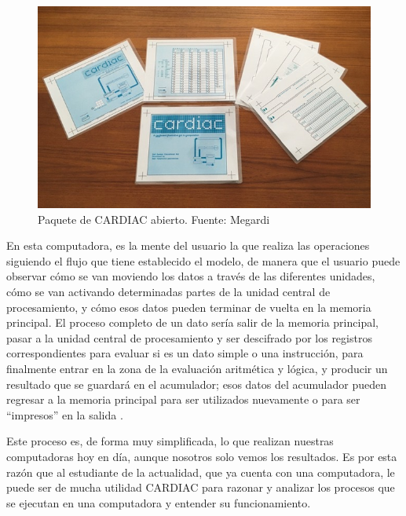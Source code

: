 \documentclass[letterpaper,12pt,oneside]{book}
\begin{document}
		\begin{figure}[h]
		\centering
			\includegraphics[scale=0.6]{media/CARDIAC_Paper/paper1.jpg}
			\caption{Paquete de CARDIAC abierto. Fuente: Megardi \cite{megardi_cardiac_nodate}}
			\label{fig:Kit_CARDIAC}%
		\end{figure}
		
		
		
		En esta computadora, es la mente del usuario la que realiza las operaciones  siguiendo el flujo que tiene establecido el modelo, de manera
		que el usuario  puede observar cómo se van moviendo los datos a través de las diferentes unidades, cómo se van activando determinadas
		partes de la unidad central de procesamiento, y cómo  esos datos pueden terminar de vuelta en la memoria principal. El proceso completo de un dato sería salir de la memoria principal, pasar
		a la unidad central de procesamiento y ser descifrado por los registros correspondientes para evaluar si es un dato simple o una instrucción,
		para finalmente entrar en la zona de la evaluación aritmética y lógica, y producir un resultado que se guardará en el acumulador; esos
		datos del acumulador pueden regresar a la memoria principal para ser utilizados nuevamente o para ser ``impresos'' en la salida \cite{fingerman_instruction_1968}.
		
  
        Este proceso es, de forma muy simplificada,
		lo que realizan nuestras computadoras hoy en día, aunque nosotros solo vemos los resultados. Es por esta 
		razón que al estudiante de la actualidad, que ya cuenta con una computadora, le puede ser de mucha utilidad
		CARDIAC para razonar y analizar los procesos que se ejecutan en una computadora y entender su funcionamiento.
\end{document}

